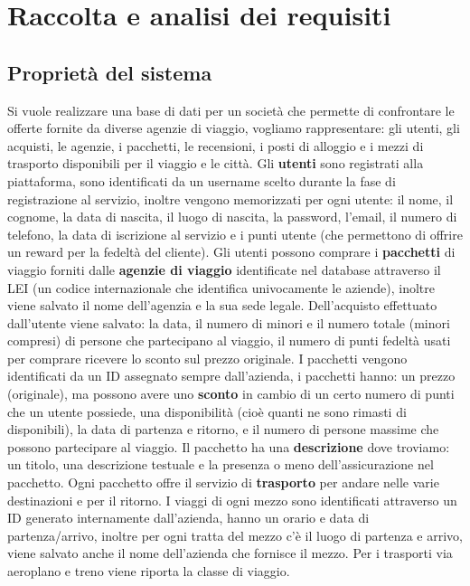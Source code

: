 \section{Raccolta e analisi dei requisiti}
\subsection{Proprietà del sistema}
%
%
Si vuole realizzare una base di dati per un società che permette di confrontare le offerte fornite da diverse agenzie di viaggio, vogliamo rappresentare: gli utenti, gli acquisti, le agenzie, i pacchetti, le recensioni, i posti di alloggio e i mezzi di trasporto disponibili per il viaggio e le città.
%
%
Gli \textbf{utenti} sono registrati alla piattaforma, sono identificati da un username scelto durante la fase di registrazione al servizio, inoltre vengono memorizzati per ogni utente: il nome, il cognome, la data di nascita, il luogo di nascita, la password, l'email, il numero di telefono, la data di iscrizione al servizio e i punti utente (che permettono di offrire un reward per la fedeltà del cliente). %
%
Gli utenti possono comprare i \textbf{pacchetti} di viaggio forniti dalle \textbf{agenzie di viaggio} identificate nel database attraverso il LEI (un codice internazionale che identifica univocamente le aziende), inoltre viene salvato il nome dell'agenzia e la sua sede legale. Dell'acquisto effettuato dall'utente viene salvato: la data, il numero di minori e il numero totale (minori compresi) di persone che partecipano al viaggio, il numero di punti fedeltà usati per comprare ricevere lo sconto sul prezzo originale.
%
I pacchetti vengono identificati da un ID assegnato sempre dall'azienda, i pacchetti hanno: un prezzo (originale), ma possono avere uno \textbf{sconto} in cambio di un certo numero di punti che un utente possiede, una disponibilità (cioè quanti ne sono rimasti di disponibili), la data di partenza e ritorno, e il numero di persone massime che possono partecipare al viaggio.
%
Il pacchetto ha una \textbf{descrizione} dove troviamo: un titolo, una descrizione testuale e la presenza o meno dell'assicurazione nel pacchetto.
%
Ogni pacchetto offre il servizio di \textbf{trasporto} per andare nelle varie destinazioni e per il ritorno. I viaggi di ogni mezzo sono identificati attraverso un ID generato internamente dall'azienda, hanno un orario e data di partenza/arrivo, inoltre per ogni tratta del mezzo c'è il luogo di partenza e arrivo, viene salvato anche il nome dell'azienda che fornisce il mezzo. Per i trasporti via aeroplano e treno viene riporta la classe di viaggio.
